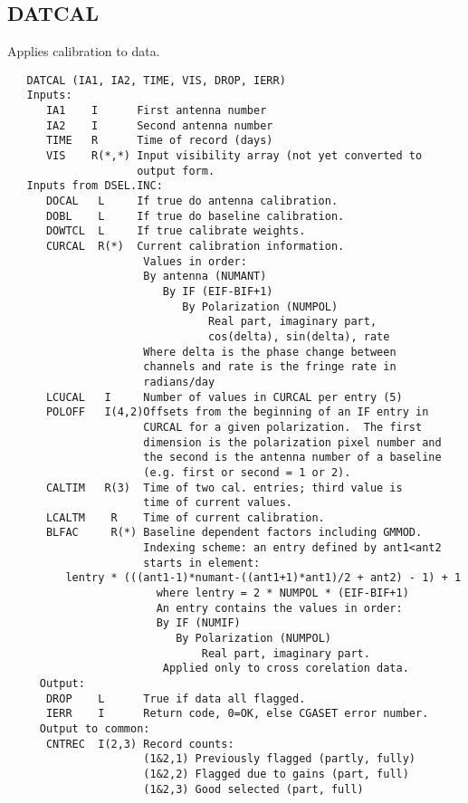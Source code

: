 \subsection{DATCAL}
Applies calibration to data.
\begin{verbatim}
   DATCAL (IA1, IA2, TIME, VIS, DROP, IERR)
   Inputs:
      IA1    I      First antenna number
      IA2    I      Second antenna number
      TIME   R      Time of record (days)
      VIS    R(*,*) Input visibility array (not yet converted to
                    output form.
   Inputs from DSEL.INC:
      DOCAL   L     If true do antenna calibration.
      DOBL    L     If true do baseline calibration.
      DOWTCL  L     If true calibrate weights.
      CURCAL  R(*)  Current calibration information.
                     Values in order:
                     By antenna (NUMANT)
                        By IF (EIF-BIF+1)
                           By Polarization (NUMPOL)
                               Real part, imaginary part,
                               cos(delta), sin(delta), rate
                     Where delta is the phase change between
                     channels and rate is the fringe rate in
                     radians/day
      LCUCAL   I     Number of values in CURCAL per entry (5)
      POLOFF   I(4,2)Offsets from the beginning of an IF entry in
                     CURCAL for a given polarization.  The first
                     dimension is the polarization pixel number and
                     the second is the antenna number of a baseline
                     (e.g. first or second = 1 or 2).
      CALTIM   R(3)  Time of two cal. entries; third value is
                     time of current values.
      LCALTM    R    Time of current calibration.
      BLFAC     R(*) Baseline dependent factors including GMMOD.
                     Indexing scheme: an entry defined by ant1<ant2
                     starts in element:
         lentry * (((ant1-1)*numant-((ant1+1)*ant1)/2 + ant2) - 1) + 1
                       where lentry = 2 * NUMPOL * (EIF-BIF+1)
                       An entry contains the values in order:
                       By IF (NUMIF)
                          By Polarization (NUMPOL)
                              Real part, imaginary part.
                        Applied only to cross corelation data.
     Output:
      DROP    L      True if data all flagged.
      IERR    I      Return code, 0=OK, else CGASET error number.
     Output to common:
      CNTREC  I(2,3) Record counts:
                     (1&2,1) Previously flagged (partly, fully)
                     (1&2,2) Flagged due to gains (part, full)
                     (1&2,3) Good selected (part, full)
\end{verbatim}

